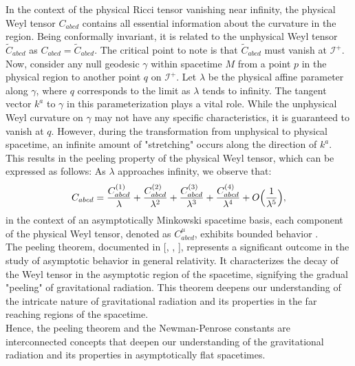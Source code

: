 In the context of the physical Ricci tensor vanishing near infinity, the physical Weyl tensor $C_{abcd}$ contains all essential information about the curvature in the region. Being conformally invariant, it is related to the unphysical Weyl tensor $\tilde{C}_{abcd}$ as $C_{abcd} = \tilde{C}_{abcd}$. The critical point to note is that $\tilde{C}_{abcd}$ must vanish at $\mathscr{I}^+$. \\

Now, consider any null geodesic $\gamma$ within spacetime $M$ from a point $p$ in the physical region to another point $q$ on $\mathscr{I}^+$. Let $\lambda$ be the physical affine parameter along $\gamma$, where $q$ corresponds to the limit as $\lambda$ tends to infinity. The tangent vector $k^{a}$ to $\gamma$ in this parameterization plays a vital role. While the unphysical Weyl curvature on $\gamma$ may not have any specific characteristics, it is guaranteed to vanish at $q$. However, during the transformation from unphysical to physical spacetime, an infinite amount of "stretching" occurs along the direction of $k^{a}$. This results in the peeling property of the physical Weyl tensor, which can be expressed as follows: As $\lambda$ approaches infinity, we observe that:
\begin{equation}\label{eq:peeling}
  C_{a b c d}=\frac{C_{a b c d}^{(1)}}{\lambda}+\frac{C_{a b c d}^{(2)}}{\lambda^{2}}+\frac{C_{a b c d}^{(3)}}{\lambda^{3}}+\frac{C_{a b c d}^{(4)}}{\lambda^{4}}+O\Bigl(\frac{1}{\lambda^{5}}\Bigr),
\end{equation}
in the context of an asymptotically Minkowski spacetime basis, each component of the physical Weyl tensor, denoted as $C_{abcd}^{\mu}$, exhibits bounded behavior \cite{Wal84a}. \\

The peeling theorem, documented in [\cite{Sac61}, \cite{BonBurMet62}, \cite{NewPen62}], represents a significant outcome in the study of asymptotic behavior in general relativity. It characterizes the decay of the Weyl tensor in the asymptotic region of
the spacetime, signifying the gradual "peeling" of gravitational radiation. This theorem deepens our understanding of the intricate nature of gravitational radiation and its properties in the far reaching regions of the spacetime.\\

Hence, the peeling theorem and the Newman-Penrose constants are interconnected concepts that deepen our
understanding of the gravitational radiation and its properties in asymptotically flat spacetimes.
